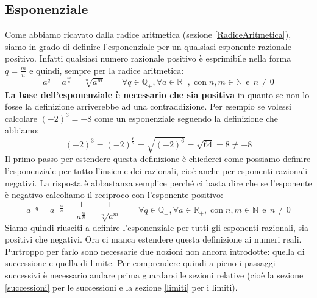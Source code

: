 \subsection{Esponenziale}
Come abbiamo ricavato dalla radice aritmetica (sezione \ref{RadiceAritmetica}), siamo in grado di definire l'esponenziale per un qualsiasi esponente razionale positivo. Infatti qualsiasi numero razionale positivo è esprimibile nella forma $q = \frac{m}{n}$ e quindi, sempre per la radice aritmetica:
\begin{equation*}
    a^q = a^{\frac{m}{n}} = \sqrt[n]{a^m} \qquad \forall q \in \mathbb{Q}_{+}, \forall a \in \mathbb{R}_{+},\; \mathrm{con}\; n,m \in \mathbb{N}\;\, \mathrm{e}\;\, n \neq 0
\end{equation*}
\textbf{La base dell'esponenziale è necessario che sia positiva} in quanto se non lo fosse la definizione arriverebbe ad una contraddizione. Per esempio se volessi calcolare $(-2)^3 = -8$ come un esponenziale seguendo la definizione che abbiamo:
\begin{equation*}
    (-2)^3 = (-2)^{\frac{6}{2}} = \sqrt{(-2)^6} = \sqrt{64} = 8 \neq -8
\end{equation*}
Il primo passo per estendere questa definizione è chiederci come possiamo definire l'esponenziale per tutto l'insieme dei razionali, cioè anche per esponenti razionali negativi. La risposta è abbastanza semplice perché ci basta dire che se l'esponente è negativo calcoliamo il reciproco con l'esponente positivo:
\begin{equation*}
    a^{-q} = a^{-\frac{m}{n}} = \dfrac{1}{a^{\frac{m}{n}}} = \dfrac{1}{\sqrt[n]{a^m}} \qquad \forall q \in \mathbb{Q}_{+}, \forall a \in \mathbb{R}_{+},\; \mathrm{con}\; n,m \in \mathbb{N}\;\, \mathrm{e}\;\, n \neq 0
\end{equation*}
Siamo quindi riusciti a definire l'esponenziale per tutti gli esponenti razionali, sia positivi che negativi. Ora ci manca estendere questa definizione ai numeri reali. Purtroppo per farlo sono necessarie due nozioni non ancora introdotte: quella di successione e quella di limite. Per comprendere quindi a pieno i passaggi successivi è necessario andare prima guardarsi le sezioni relative (cioè la sezione \ref{successioni} per le successioni e la sezione \ref{limiti} per i limiti).\\


